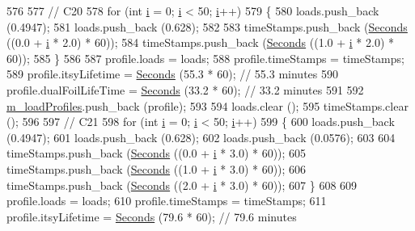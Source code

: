\begin{DoxyCode}
576 
577   \textcolor{comment}{// C20}
578   \textcolor{keywordflow}{for} (\textcolor{keywordtype}{int} \hyperlink{bernuolliDistribution_8m_a6f6ccfcf58b31cb6412107d9d5281426}{i} = 0; \hyperlink{bernuolliDistribution_8m_a6f6ccfcf58b31cb6412107d9d5281426}{i} < 50; \hyperlink{bernuolliDistribution_8m_a6f6ccfcf58b31cb6412107d9d5281426}{i}++)
579     \{
580       loads.push\_back (0.4947);
581       loads.push\_back (0.628);
582 
583       timeStamps.push\_back (\hyperlink{group__timecivil_ga33c34b816f8ff6628e33d5c8e9713b9e}{Seconds} ((0.0 + \hyperlink{bernuolliDistribution_8m_a6f6ccfcf58b31cb6412107d9d5281426}{i} * 2.0) * 60));
584       timeStamps.push\_back (\hyperlink{group__timecivil_ga33c34b816f8ff6628e33d5c8e9713b9e}{Seconds} ((1.0 + \hyperlink{bernuolliDistribution_8m_a6f6ccfcf58b31cb6412107d9d5281426}{i} * 2.0) * 60));
585     \}
586 
587   profile.loads = loads;
588   profile.timeStamps = timeStamps;
589   profile.itsyLifetime = \hyperlink{group__timecivil_ga33c34b816f8ff6628e33d5c8e9713b9e}{Seconds} (55.3 * 60);       \textcolor{comment}{// 55.3 minutes}
590   profile.dualFoilLifeTime = \hyperlink{group__timecivil_ga33c34b816f8ff6628e33d5c8e9713b9e}{Seconds} (33.2 * 60);   \textcolor{comment}{// 33.2 minutes}
591 
592   \hyperlink{classBatteryLifetimeTest_aee9ad324da18f58ee75689778580c3fb}{m\_loadProfiles}.push\_back (profile);
593 
594   loads.clear ();
595   timeStamps.clear ();
596 
597   \textcolor{comment}{// C21}
598   \textcolor{keywordflow}{for} (\textcolor{keywordtype}{int} \hyperlink{bernuolliDistribution_8m_a6f6ccfcf58b31cb6412107d9d5281426}{i} = 0; \hyperlink{bernuolliDistribution_8m_a6f6ccfcf58b31cb6412107d9d5281426}{i} < 50; \hyperlink{bernuolliDistribution_8m_a6f6ccfcf58b31cb6412107d9d5281426}{i}++)
599     \{
600       loads.push\_back (0.4947);
601       loads.push\_back (0.628);
602       loads.push\_back (0.0576);
603 
604       timeStamps.push\_back (\hyperlink{group__timecivil_ga33c34b816f8ff6628e33d5c8e9713b9e}{Seconds} ((0.0 + \hyperlink{bernuolliDistribution_8m_a6f6ccfcf58b31cb6412107d9d5281426}{i} * 3.0) * 60));
605       timeStamps.push\_back (\hyperlink{group__timecivil_ga33c34b816f8ff6628e33d5c8e9713b9e}{Seconds} ((1.0 + \hyperlink{bernuolliDistribution_8m_a6f6ccfcf58b31cb6412107d9d5281426}{i} * 3.0) * 60));
606       timeStamps.push\_back (\hyperlink{group__timecivil_ga33c34b816f8ff6628e33d5c8e9713b9e}{Seconds} ((2.0 + \hyperlink{bernuolliDistribution_8m_a6f6ccfcf58b31cb6412107d9d5281426}{i} * 3.0) * 60));
607     \}
608 
609   profile.loads = loads;
610   profile.timeStamps = timeStamps;
611   profile.itsyLifetime = \hyperlink{group__timecivil_ga33c34b816f8ff6628e33d5c8e9713b9e}{Seconds} (79.6 * 60);       \textcolor{comment}{// 79.6 minutes}

\end{DoxyCode}
